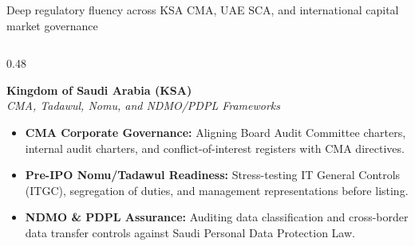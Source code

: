 \documentclass[aspectratio=169, 8pt]{beamer}
\begin{document}
\begin{frame}{Deep regulatory fluency across KSA CMA, UAE SCA, and international capital market governance}
    \vspace{-0.15cm}
    \begin{columns}[T]
        \begin{column}{0.48\textwidth}
            \begin{tcolorbox}[colback=cardBg, colframe=cardBorder, arc=1pt, boxrule=0.5pt, left=4pt, right=4pt, top=3pt, bottom=3pt]
                \textbf{\normalsize \color{terracotta} Kingdom of Saudi Arabia (KSA)} \\
                \textit{\scriptsize \color{textMuted} CMA, Tadawul, Nomu, and NDMO/PDPL Frameworks}
            \end{tcolorbox}
            \vspace{0.1cm}
            \begin{itemize}
                \setlength{\itemsep}{2.5pt}
                \item \textbf{CMA Corporate Governance:} Aligning Board Audit Committee charters, internal audit charters, and conflict-of-interest registers with CMA directives.
                \item \textbf{Pre-IPO Nomu/Tadawul Readiness:} Stress-testing IT General Controls (ITGC), segregation of duties, and management representations before listing.
                \item \textbf{NDMO \& PDPL Assurance:} Auditing data classification and cross-border data transfer controls against Saudi Personal Data Protection Law.
            \end{itemize}
        \end{column}
        

\end{columns}
\end{frame}
\end{document}
